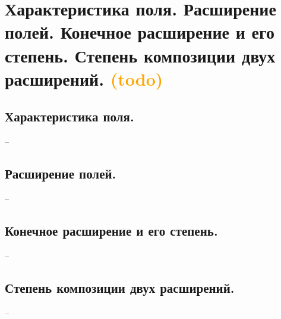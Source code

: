 \section{Характеристика поля. Расширение полей. Конечное расширение и его степень. Степень композиции двух расширений. \textcolor{orange}{(todo)}}

\subsection{Характеристика поля.}
--

\subsection{Расширение полей.}
--

\subsection{Конечное расширение и его степень.}
--

\subsection{Степень композиции двух расширений.}
--
